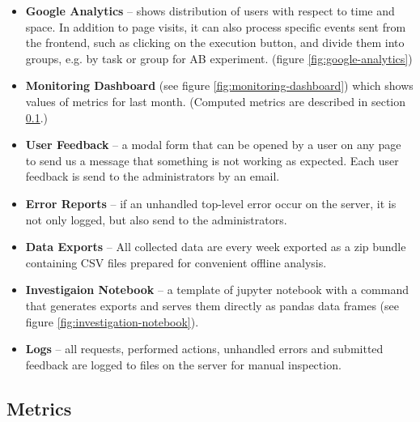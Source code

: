 \begin{itemize}
\item \textbf{Google Analytics} --
  shows distribution of users with respect to time and space.
  In addition to page visits,
  it can also process specific events sent from the frontend,
  such as clicking on the execution button,
  and divide them into groups, e.g. by task or group for AB experiment.
  (figure \ref{fig:google-analytics})
\item \textbf{Monitoring Dashboard} (see figure \ref{fig:monitoring-dashboard})
      which shows values of metrics for last month.
      (Computed metrics are described in section \ref{sec:robomission.metrics}.)
\item \textbf{User Feedback} --
  a modal form that can be opened by a user on any page
  to send us a message that something is not working as expected.
  Each user feedback is send to the administrators by an email.
\item \textbf{Error Reports} --
  if an unhandled top-level error occur on the server,
  it is not only logged, but also send to the administrators.
\item \textbf{Data Exports} --
  All collected data are every week exported as a zip bundle containing
  CSV files prepared for convenient offline analysis.
\item \textbf{Investigaion Notebook} --
  a template of jupyter notebook with a command that generates exports
  and serves them directly as pandas data frames
  (see figure \ref{fig:investigation-notebook}).
\item \textbf{Logs} --
  all requests, performed actions, unhandled errors and submitted feedback are logged
  to files on the server for manual inspection.
\end{itemize}






\subsection{Metrics}
\label{sec:robomission.metrics}


